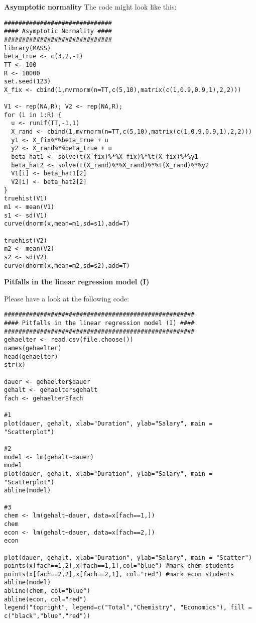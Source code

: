 \begin{Solution}{7.5}
\textbf{Asymptotic normality}
The code might look like this:
\begin{verbatim}
##############################
#### Asymptotic Normality ####
##############################
library(MASS)
beta_true <- c(3,2,-1)
TT <- 100
R <- 10000
set.seed(123)
X_fix <- cbind(1,mvrnorm(n=TT,c(5,10),matrix(c(1,0.9,0.9,1),2,2)))

V1 <- rep(NA,R); V2 <- rep(NA,R);
for (i in 1:R) {
  u <- runif(TT,-1,1)
  X_rand <- cbind(1,mvrnorm(n=TT,c(5,10),matrix(c(1,0.9,0.9,1),2,2)))
  y1 <- X_fix%*%beta_true + u
  y2 <- X_rand%*%beta_true + u
  beta_hat1 <- solve(t(X_fix)%*%X_fix)%*%t(X_fix)%*%y1
  beta_hat2 <- solve(t(X_rand)%*%X_rand)%*%t(X_rand)%*%y2
  V1[i] <- beta_hat1[2]
  V2[i] <- beta_hat2[2]
}
truehist(V1)
m1 <- mean(V1)
s1 <- sd(V1)
curve(dnorm(x,mean=m1,sd=s1),add=T)

truehist(V2)
m2 <- mean(V2)
s2 <- sd(V2)
curve(dnorm(x,mean=m2,sd=s2),add=T)
\end{verbatim}
\end{Solution}
\begin{Solution}{7.6}
\textbf{Pitfalls in the linear regression model (I)}

Please have a look at the following code:
\begin{verbatim}
#####################################################
#### Pitfalls in the linear regression model (I) ####
#####################################################
gehaelter <- read.csv(file.choose())
names(gehaelter)
head(gehaelter)
str(x)

dauer <- gehaelter$dauer
gehalt <- gehaelter$gehalt
fach <- gehaelter$fach

#1
plot(dauer, gehalt, xlab="Duration", ylab="Salary", main = "Scatterplot")

#2
model <- lm(gehalt~dauer)
model
plot(dauer, gehalt, xlab="Duration", ylab="Salary", main = "Scatterplot")
abline(model)

#3
chem <- lm(gehalt~dauer, data=x[fach==1,])
chem
econ <- lm(gehalt~dauer, data=x[fach==2,])
econ

plot(dauer, gehalt, xlab="Duration", ylab="Salary", main = "Scatter")
points(x[fach==1,2],x[fach==1,1],col="blue") #mark chem students
points(x[fach==2,2],x[fach==2,1], col="red") #mark econ students
abline(model)
abline(chem, col="blue")
abline(econ, col="red")
legend("topright", legend=c("Total","Chemistry", "Economics"), fill = c("black","blue","red"))
\end{verbatim}
\end{Solution}
